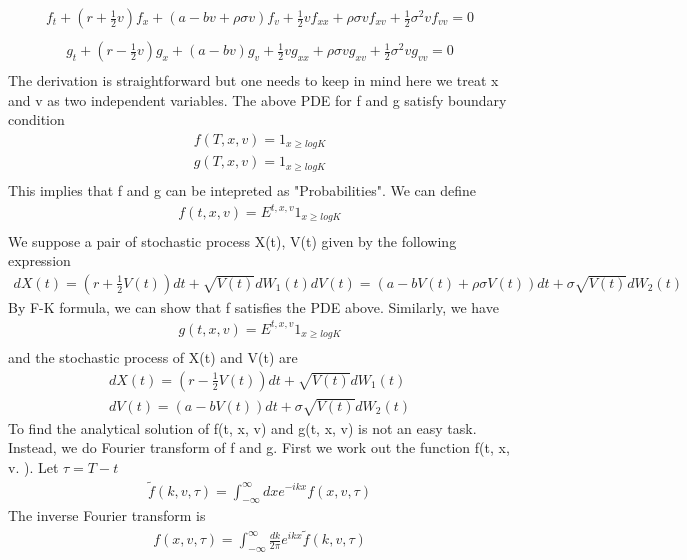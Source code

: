 \documentclass[a4paper]{article}
\begin{document}
\begin{align}\label{f}
	f_t + (r + \frac{1}{2}v)f_x + (a-bv+\rho \sigma v)f_v 
	+ \frac{1}{2}  v f_{xx} + \rho \sigma vf_{xv}
        +\frac{1}{2} \sigma^2 vf_{vv} = 0\\
\end{align}
\begin{align}
	g_t + (r - \frac{1}{2}v)g_x + (a-bv)g_v 
	+ \frac{1}{2}  v g_{xx} + \rho \sigma vg_{xv}
        +\frac{1}{2} \sigma^2 vg_{vv} = 0\\
\end{align}
The derivation is straightforward but one needs to keep in mind here we treat x and v as two independent variables. The above PDE for f and g satisfy boundary condition
\begin{align*}
	f(T, x, v) = 1_{x\geq logK}\\
	g(T, x, v) = 1_{x\geq logK}\\
\end{align*}
This implies that f and g can be intepreted as "Probabilities". We can define
\begin{align*}
	f(t, x, v) = E^{t,x,v}1_{x\geq logK}\\
\end{align*}
We suppose a pair of stochastic process X(t), V(t) given by the following expression
\begin{align*}
	dX(t) = (r+\frac{1}{2}V(t))dt + \sqrt{V(t)}dW_1(t)
	dV(t) = (a-bV(t)+ \rho \sigma V(t))dt + \sigma \sqrt{V(t)}dW_2(t)
\end{align*}
By F-K formula, we can show that f satisfies the PDE above. Similarly, we have
\begin{align*}
	g(t, x, v) = E^{t,x,v} 1_{x\geq logK}\\
\end{align*}
and the stochastic process of X(t) and V(t) are
\begin{align*}
	dX(t) = (r-\frac{1}{2}V(t))dt + \sqrt{V(t)}dW_1(t)\\
	dV(t) = (a-bV(t))dt + \sigma \sqrt{V(t)}dW_2(t)
\end{align*}
To find the analytical solution of f(t, x, v) and g(t, x, v) is not an easy task. Instead, we do Fourier transform of f and g. 
First we work out the function f(t, x, v. ). Let $\tau = T-t$
\begin{align*}
	\tilde f(k, v, \tau) = \int_{-\infty}^{\infty}dx e^{-ikx}f(x, v, \tau)
\end{align*}
The inverse Fourier transform is
\begin{align*}
	f(x, v, \tau) = \int_{-\infty}^{\infty}\frac{dk}{2\pi} e^{ikx}
	\tilde f(k, v, \tau)
\end{align*}
\end{document}
